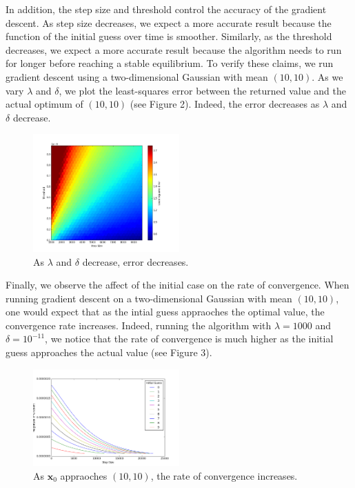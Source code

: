 \documentclass{paper}
\begin{document}
In addition, the step size and threshold control the accuracy of the gradient descent. As step size decreases, we expect a more accurate result because the function of the initial guess over time is smoother. Similarly, as the threshold decreases, we expect a more accurate result because the algorithm needs to run for longer before reaching a stable equilibrium. To verify these claims, we run gradient descent using a two-dimensional Gaussian with mean $(10, 10)$. As we vary $\lambda$ and $\delta$, we plot the least-squares error between the returned value and the actual optimum of $(10, 10)$ (see Figure 2). Indeed, the error decreases as $\lambda$ and $\delta$ decrease.

\begin{figure}[ht!]
  \centering
    \includegraphics[width=0.5\textwidth]{../images/lsq_error_gradient}
  \caption{As $\lambda$ and $\delta$ decrease, error decreases.}
\end{figure}

Finally, we observe the affect of the initial case on the rate of convergence. When running gradient descent on a two-dimensional Gaussian with mean $(10, 10)$, one would expect that as the intial guess appraoches the optimal value, the convergence rate increases. Indeed, running the algorithm with $\lambda = 1000$ and $\delta = 10^{-11}$, we notice that the rate of convergence is much higher as the initial guess approaches the actual value (see Figure 3). 

\begin{figure}[ht!]
  \centering
    \includegraphics[width=0.5\textwidth]{../images/guess_vs_mags_2}
  \caption{As $\mathbf{x}_0$ appraoches $(10, 10)$, the rate of convergence increases.}
\end{figure}
\end{document}
